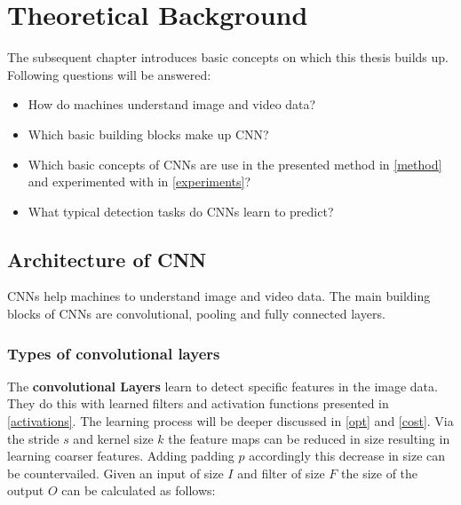 


\chapter{Theoretical Background} %

\label{theory} %
The subsequent chapter introduces basic concepts on which this thesis builds up.
Following questions will be answered:
\begin{itemize}
    \item How do machines understand image and video data?
    \item Which basic building blocks make up \gls{CNN}?
    \item Which basic concepts of \glspl{CNN} are use in the presented method in \autoref{method} and experimented with in \autoref{experiments}?
    \item What typical detection tasks do \glspl{CNN} learn to predict?

\end{itemize}

\section{Architecture of \gls{CNN}}
\glspl{CNN} help machines to understand image and video data.
The main building blocks of \glspl{CNN} are convolutional, pooling and fully connected layers.
\subsection{Types of convolutional layers}
The \textbf{convolutional Layers} learn to detect specific features in the image data.
They do this with learned filters and activation functions presented in \autoref{activations}.
The learning process will be deeper discussed in \autoref{opt} and \autoref{cost}.
Via the stride $s$ and kernel size $k$ the feature maps can be reduced in size resulting in
learning coarser features.
Adding padding $p$ accordingly this decrease in size can be countervailed.
Given an input of size $I$ and filter of size $F$ the size of the output $O$ can be calculated as follows:

